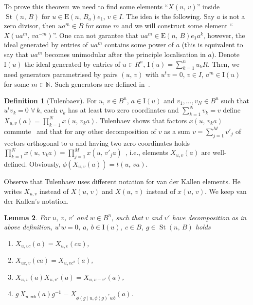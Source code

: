 \documentclass[11pt]{amsart}
\theoremstyle{plain} \declaretheorem[name=Theorem, Refname={Theorem,Theorems}]{tm} \Crefname{tm}{Theorem}{Theorems}
\numberwithin{equation}{section}
\newtheorem{lm}{Lemma} \numberwithin{lm}{section} \Crefname{lm}{Lemma}{Lemmas}
\theoremstyle{definition} \newtheorem{df}[lm]{Definition} \Crefname{df}{Definition}{Definitions}
\theoremstyle{remark} \newtheorem{rk}[lm]{Remark} \Crefname{rk}{Remark}{Remarks}
\newcommand{\E}{{\mathrm{E}}}
\newcommand{\St}{\mathop{\mathrm{St}}\nolimits}
\newcommand{\inv}{^{-1}}
\begin{document}
To prove this theorem we need to find some elements ``$X(u,\,v)$'' inside $\St(n,\,B)$ for $u\in\E(n,\,B_a)e_1$, $v\in I$. The idea is the following. Say $a$ is not a zero divisor, then $ua^m\in B$ for some $m$ and we will construct some element ``$X(ua^m,\,va^{-m})$''. One can not garantee that $ua^m\in\E(n,\,B)e_1a^k$, however, the ideal generated by entries of $ua^m$ contains some power of $a$ (this is equivalent to say that $ua^m$ becomes unimodular after the principle localisation in $a$). Denote $\mathrm I(u)$ the ideal generated by entries of $u\in R^n$, $\mathrm I(u)=\sum\limits_{k=1}^nu_kR$. Then, we need generators parametrised by pairs $(u,\,v)$ with $u^tv=0$, $v\in I$, $a^m\in\mathrm I(u)$ for some $m\in\mathbb N$. Such generators are defined in~\cite{Tul}.

\begin{df}[Tulenbaev]
For $u$, $v\in B^n$, $a\in\mathrm I(u)$ and $v_1,\ldots,v_N\in B^n$ such that $u^tv_k=0$ $\forall\,k$,  each $v_k$ has at least two zero coordinates and $\sum_{k=1}^Nv_k=v$ define $X_{u,v}(a)=\prod\limits_{k=1}^Nx(u,\,v_ka)$. Tulenbaev shows that factors $x(u,\,v_ka)$ commute~\cite[Lem.~1.1\,e)]{Tul} and that for any other decomposition of $v$ as a sum $v=\sum_{j=1}^Mv'_j$ of vectors orthogonal to $u$ and having two zero coordinates holds $\prod_{k=1}^Nx(u,\,v_ka)=\prod_{j=1}^Mx(u,\,v'_ja)$~\cite[p.~3]{Tul}, i.e., elements $X_{u,v}(a)$ are well-defined. Obviously, $\phi(X_{u,v}(a))=t(u,\,va)$.
\end{df}

Observe that Tulenbaev uses different notation for van der Kallen elements. He writes $X_{u,v}$ instead of $X(u,\,v)$ and $X(u,\,v)$ instead of $x(u,\,v)$. We keep van der Kallen's notation.

\begin{lm}
\label{xproperties}
For $u$, $v$, $v'$ and $w\in B^n$, such that $v$ and $v'$ have decomposition as in above definition, $u^tw=0$, $a$, $b\in\mathrm I(u)$, $c\in B$, $g\in\St(n,\,B)$ holds
\begin{enumerate}
\item
$X_{u,vc}(a)=X_{u,v}(ca)$,
\item
$X_{uc,v}(ca)=X_{u,vc^2}(a)$,
\item
$X_{u,v}(a)X_{u,v'}(a)=X_{u,v+v'}(a)$,
\item
$g\,X_{u,wb}(a)g\inv=X_{\phi(g)u,\phi(g)^*wb}(a)$.
\end{enumerate}
\end{lm}
\end{document}
